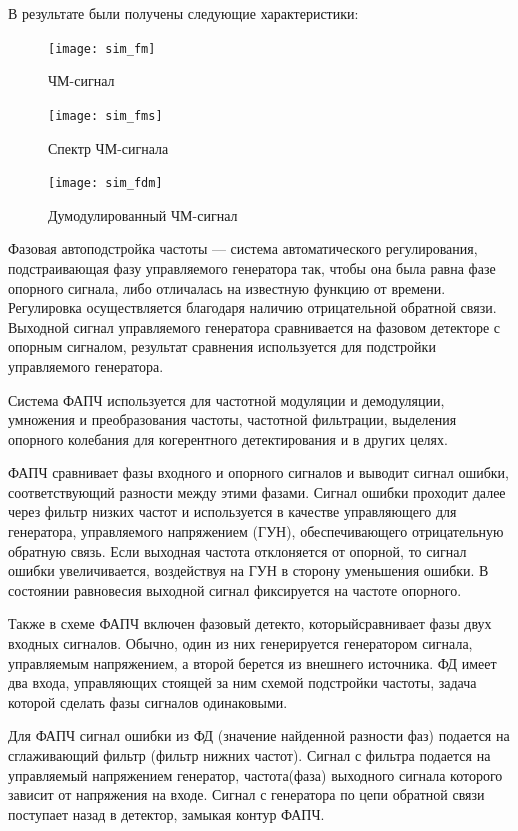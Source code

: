 \documentclass[10pt,a4paper]{article}
\begin{document}
В результате были получены следующие характеристики:
\begin{figure}[h]\centering
  \parbox[b]{0.49\textwidth}{\centering
    \texttt{[image: sim\_fm]} 
    \caption{ЧМ-сигнал}\label{fig.sim_fm}}
  \hfil\hfil 
  \begin{minipage}[b]{0.49\textwidth}
	\centering
	\texttt{[image: sim\_fms]}
	\caption{Спектр ЧМ-сигнала}\label{fig.sim_fms} 
  \end{minipage}
\end{figure}

\begin{figure}[h]\centering
    \texttt{[image: sim\_fdm]} 
    \caption{Думодулированный ЧМ-сигнал}\label{fig.sim_fdm}
\end{figure}
\FloatBarrier

Фазовая автоподстройка частоты — система автоматического регулирования, подстраивающая фазу управляемого генератора так, чтобы она была равна фазе опорного сигнала, либо отличалась на известную функцию от времени. Регулировка осуществляется благодаря наличию отрицательной обратной связи. Выходной сигнал управляемого генератора сравнивается на фазовом детекторе с опорным сигналом, результат сравнения используется для подстройки управляемого генератора.

Система ФАПЧ используется для частотной модуляции и демодуляции, умножения и преобразования частоты, частотной фильтрации, выделения опорного колебания для когерентного детектирования и в других целях.

ФАПЧ сравнивает фазы входного и опорного сигналов и выводит сигнал ошибки, соответствующий разности между этими фазами. Сигнал ошибки проходит далее через фильтр низких частот и используется в качестве управляющего для генератора, управляемого напряжением (ГУН), обеспечивающего отрицательную обратную связь. Если выходная частота отклоняется от опорной, то сигнал ошибки увеличивается, воздействуя на ГУН в сторону уменьшения ошибки. В состоянии равновесия выходной сигнал фиксируется на частоте опорного.

Также в схеме ФАПЧ включен фазовый детекто, которыйсравнивает фазы двух входных сигналов. Обычно, один из них генерируется генератором сигнала, управляемым напряжением, а второй берется из внешнего источника. ФД имеет два входа, управляющих стоящей за ним схемой подстройки частоты, задача которой сделать фазы сигналов одинаковыми.

Для ФАПЧ сигнал ошибки из ФД (значение найденной разности фаз) подается на сглаживающий фильтр (фильтр нижних частот). Сигнал с фильтра подается на управляемый напряжением генератор, частота(фаза) выходного сигнала которого зависит от напряжения на входе. Сигнал с генератора по цепи обратной связи поступает назад в детектор, замыкая контур ФАПЧ.
\end{document}
